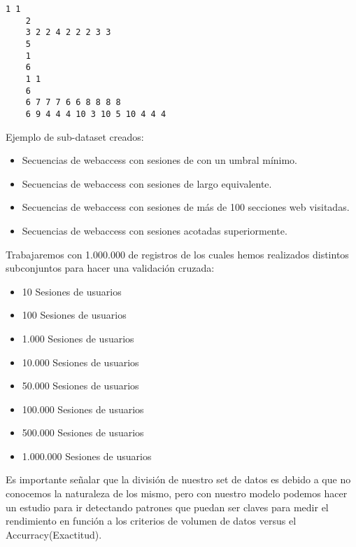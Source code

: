 	
	\begin{lstlisting}[frame=single,basicstyle=\ttfamily\tiny,]
	1 1 
	2 
	3 2 2 4 2 2 2 3 3 
	5 
	1 
	6 
	1 1 
	6 
	6 7 7 7 6 6 8 8 8 8 
	6 9 4 4 4 10 3 10 5 10 4 4 4 
	\end{lstlisting}


 Ejemplo de sub-dataset creados:

\begin{itemize}
	\item Secuencias de webaccess con sesiones de con un umbral mínimo.
	\item Secuencias de webaccess con sesiones de largo equivalente.
	\item Secuencias de webaccess con sesiones de más de 100 secciones web visitadas.
	\item Secuencias de webaccess con sesiones acotadas superiormente.
	
\end{itemize}


Trabajaremos con 1.000.000 de registros de los cuales hemos realizados distintos subconjuntos para hacer una validación cruzada:

\begin{itemize}
	\item 10 Sesiones de usuarios
	\item 100 Sesiones de usuarios
	\item 1.000 Sesiones de usuarios
	\item 10.000 Sesiones de usuarios
	\item 50.000 Sesiones de usuarios
	\item 100.000 Sesiones de usuarios
	\item 500.000 Sesiones de usuarios
	\item 1.000.000 Sesiones de usuarios
\end{itemize}


Es importante señalar que la división de nuestro set de datos es debido a que no conocemos la naturaleza de los mismo, pero con nuestro modelo podemos hacer un estudio para ir detectando patrones que puedan ser claves para medir el rendimiento en función a los criterios de volumen de datos versus el Accurracy(Exactitud).







